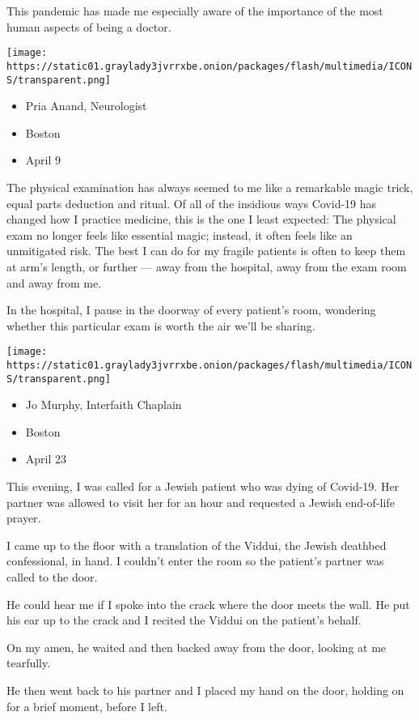 This pandemic has made me especially aware of the importance of the most
human aspects of being a doctor.

\texttt{[image: https://static01.graylady3jvrrxbe.onion/packages/flash/multimedia/ICONS/transparent.png]}

\begin{itemize}
\tightlist
\item
  Pria Anand, Neurologist
\item
  Boston
\item
  April 9
\end{itemize}

The physical examination has always seemed to me like a remarkable magic
trick, equal parts deduction and ritual. Of all of the insidious ways
Covid-19 has changed how I practice medicine, this is the one I least
expected: The physical exam no longer feels like essential magic;
instead, it often feels like an unmitigated risk. The best I can do for
my fragile patients is often to keep them at arm's length, or further
--- away from the hospital, away from the exam room and away from me.

In the hospital, I pause in the doorway of every patient's room,
wondering whether this particular exam is worth the air we'll be
sharing.

\texttt{[image: https://static01.graylady3jvrrxbe.onion/packages/flash/multimedia/ICONS/transparent.png]}

\begin{itemize}
\tightlist
\item
  Jo Murphy, Interfaith Chaplain
\item
  Boston
\item
  April 23
\end{itemize}

This evening, I was called for a Jewish patient who was dying of
Covid-19. Her partner was allowed to visit her for an hour and requested
a Jewish end-of-life prayer.

I came up to the floor with a translation of the Viddui, the Jewish
deathbed confessional, in hand. I couldn't enter the room so the
patient's partner was called to the door.

He could hear me if I spoke into the crack where the door meets the
wall. He put his ear up to the crack and I recited the Viddui on the
patient's behalf.

On my amen, he waited and then backed away from the door, looking at me
tearfully.

He then went back to his partner and I placed my hand on the door,
holding on for a brief moment, before I left.

